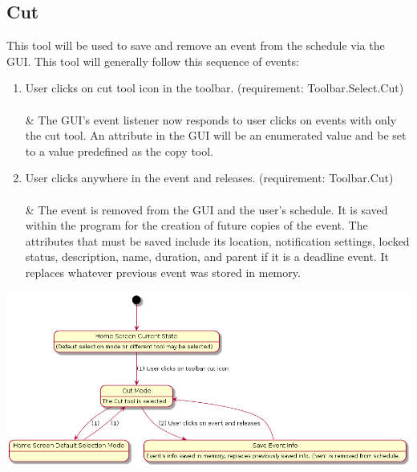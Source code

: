 \documentclass{scrreprt}
\begin{document}
\subsection{Cut}
This tool will be used to save and remove an event from the schedule via the GUI. This tool will generally follow this sequence of events:
\begin{enumerate}
    \item User clicks on cut tool icon in the toolbar. (requirement: Toolbar.Select.Cut)\\
    \\ & The GUI's event listener now responds to user clicks on events with only the cut tool. An attribute in the GUI will be an enumerated value and be set to a value predefined as the copy tool.
    \item User clicks anywhere in the event and releases. (requirement: Toolbar.Cut)\\
    \\ & The event is removed from the GUI and the user's schedule. It is saved within the program for the creation of future copies of the event. The attributes that must be saved include its location, notification settings, locked status, description, name, duration, and parent if it is a deadline event. It replaces whatever previous event was stored in memory.
\end{enumerate}
\includegraphics[width=\textwidth]{cut.png}
\end{document}
